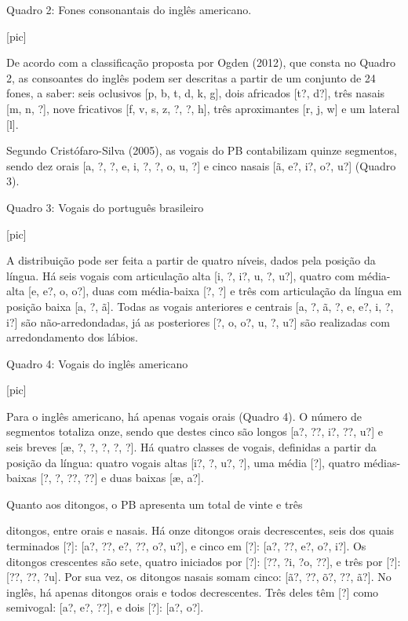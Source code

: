           Quadro 2: Fones consonantais do ingl\^es americano.

                                [pic]

De acordo com a classifica\c{c}\~ao proposta por Ogden (2012), que consta no
Quadro 2, as consoantes do ingl\^es podem ser descritas a partir de um
conjunto de 24 fones, a saber: seis oclusivos {[}p, b, t, d, k, g{]},
dois africados {[}t?, d?{]}, tr\^es nasais {[}m, n, ?{]}, nove fricativos
{[}f, v, s, z, ?, ?, h{]}, tr\^es aproximantes {[}r, j, w{]} e um lateral
{[}l{]}.

Segundo Crist\'ofaro-Silva (2005), as vogais do PB contabilizam quinze
segmentos, sendo dez orais {[}a, ?, ?, e, i, ?, ?, o, u, ?{]} e cinco
nasais {[}\~a, e?, i?, o?, u?{]} (Quadro 3).

              Quadro 3: Vogais do portugu\^es brasileiro

                                [pic]

A distribui\c{c}\~ao pode ser feita a partir de quatro n\'iveis, dados pela
posi\c{c}\~ao da l\'ingua. H\'a seis vogais com articula\c{c}\~ao alta {[}i, ?, i?, u,
?, u?{]}, quatro com m\'edia-alta {[}e, e?, o, o?{]}, duas com m\'edia-baixa
{[}?, ?{]} e tr\^es com articula\c{c}\~ao da l\'ingua em posi\c{c}\~ao baixa {[}a, ?,
\~a{]}. Todas as vogais anteriores e centrais {[}a, ?, \~a, ?, e, e?, i, ?,
i?{]} s\~ao n\~ao-arredondadas, j\'a as posteriores {[}?, o, o?, u, ?, u?{]}
s\~ao realizadas com arredondamento dos l\'abios.

                Quadro 4: Vogais do ingl\^es americano

                                [pic]

Para o ingl\^es americano, h\'a apenas vogais orais (Quadro 4). O n\'umero de
segmentos totaliza onze, sendo que destes cinco s\~ao longos {[}a?, ??,
i?, ??, u?{]} e seis breves {[}æ, ?, ?, ?, ?, ?{]}. H\'a quatro classes de
vogais, definidas a partir da posi\c{c}\~ao da l\'ingua: quatro vogais altas
{[}i?, ?, u?, ?{]}, uma m\'edia {[}?{]}, quatro m\'edias-baixas {[}?, ?, ??,
??{]} e duas baixas {[}æ, a?{]}.

  Quanto aos  ditongos,  o  PB  apresenta  um  total  de  vinte  e  tr\^es

ditongos, entre orais e nasais. H\'a onze ditongos orais decrescentes,
seis dos quais terminados {[}?{]}: {[}a?, ??, e?, ??, o?, u?{]}, e cinco
em {[}?{]}: {[}a?, ??, e?, o?, i?{]}. Os ditongos crescentes s\~ao sete,
quatro iniciados por {[}?{]}: {[}??, ?i, ?o, ??{]}, e tr\^es por {[}?{]}:
{[}??, ??, ?u{]}. Por sua vez, os ditongos nasais somam cinco: {[}\~a?,
??, \~o?, ??, \~a?{]}. No ingl\^es, h\'a apenas ditongos orais e todos
decrescentes. Tr\^es deles t\^em {[}?{]} como semivogal: {[}a?, e?, ??{]}, e
dois {[}?{]}: {[}a?, o?{]}.

